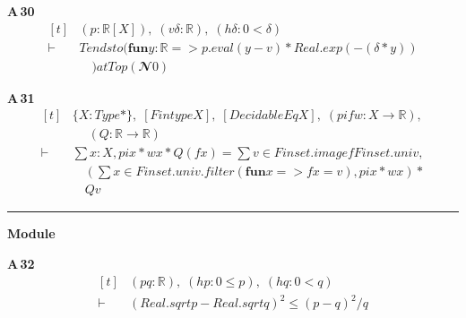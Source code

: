\noindent\textbf{A\,30}\quad{}
{\footnotesize\[ \begin{aligned}[t]
&(\mathit{p} : \mathbb{R} [\mathit{X}]),\; (\mathit{v} \delta : \mathbb{R} ),\; (\mathit{hδ} : 0 < \delta )\\
\vdash\;&\mathit{Tendsto} (\mathbf{fun} \mathit{y} : \mathbb{R} => \mathit{p}.\mathit{eval} (\mathit{y} - \mathit{v}) * \mathit{Real}.\mathit{exp} (-(\delta * \mathit{y}))\\
&\quad ) \mathit{atTop} (𝓝 0)
\end{aligned} \]}

\noindent\textbf{A\,31}\quad{}
{\footnotesize\[ \begin{aligned}[t]
&\{ \mathit{X} : \mathit{Type}*\},\; [\mathit{Fintype} \mathit{X}],\; [\mathit{DecidableEq} \mathit{X}],\; (\mathit{pi} \mathit{f} \mathit{w} : \mathit{X} \to \mathbb{R} ),\\
&\quad \; (\mathit{Q} : \mathbb{R} \to \mathbb{R} )\\
\vdash\;&\textstyle\sum \mathit{x} : \mathit{X}, \mathit{pi} \mathit{x} * \mathit{w} \mathit{x} * \mathit{Q} (\mathit{f} \mathit{x}) = \textstyle\sum \mathit{v} \in \mathit{Finset}.\mathit{image} \mathit{f} \mathit{Finset}.\mathit{univ},\\
&\quad (\textstyle\sum \mathit{x} \in \mathit{Finset}.\mathit{univ}.\mathit{filter} (\mathbf{fun} \mathit{x} => \mathit{f} \mathit{x} = \mathit{v}), \mathit{pi} \mathit{x} * \mathit{w} \mathit{x}) *\\
&\quad \mathit{Q} \mathit{v}
\end{aligned} \]}

\vspace{4pt}\noindent\rule{\columnwidth}{0.4pt}\par\vspace{2pt}
\noindent\textbf{Module }\par\vspace{3pt}

\noindent\textbf{A\,32}\quad{}
{\footnotesize\[ \begin{aligned}[t]
&(\mathit{p} \mathit{q} : \mathbb{R} ),\; (\mathit{hp} : 0 \leq \mathit{p}),\; (\mathit{hq} : 0 < \mathit{q})\\
\vdash\;&(\mathit{Real}.\mathit{sqrt} \mathit{p} - \mathit{Real}.\mathit{sqrt} \mathit{q}) ^{2} \leq (\mathit{p} - \mathit{q}) ^{2} / \mathit{q}
\end{aligned} \]}

